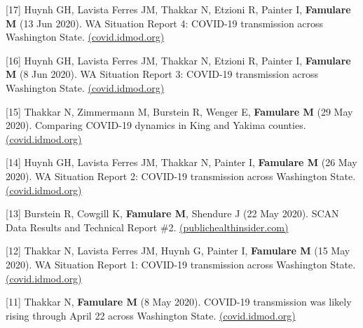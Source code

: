 \documentclass{article}
\begin{document}
\begin{llist}
\begin{items}
	\item[{[17]}] Huynh GH, Lavista Ferres JM, Thakkar N, Etzioni R, Painter I, \textbf{Famulare M} (13 Jun 2020). WA Situation Report 4: COVID-19 transmission across Washington State. \href{https://iazpvnewgrp01.blob.core.windows.net/source/2021-02/reports/pdf/WA_Situation_Report_4_COVID-19_transmission_across_Washington_State.pdf}{(covid.idmod.org)} 
	
	\item[{[16]}] Huynh GH, Lavista Ferres JM, Thakkar N, Etzioni R, Painter I, \textbf{Famulare M} (8 Jun 2020). WA Situation Report 3: COVID-19 transmission across Washington State. \href{https://iazpvnewgrp01.blob.core.windows.net/source/2021-02/reports/pdf/WA_Situation_Report_3_COVID-19_transmission_across_Washington_State.pdf}{(covid.idmod.org)} 
	
	\item[{[15]}] Thakkar N, Zimmermann M, Burstein R, Wenger E, \textbf{Famulare M} (29 May 2020). Comparing COVID-19 dynamics in King and Yakima counties. \href{https://iazpvnewgrp01.blob.core.windows.net/source/2021-02/reports/pdf/Comparing_COVID-19_dynamics_in_King_and_Yakima_counties.pdf}{(covid.idmod.org)}
	
	\item[{[14]}] Huynh GH, Lavista Ferres JM, Thakkar N, Painter I, \textbf{Famulare M} (26 May 2020). WA Situation Report 2: COVID-19 transmission across Washington State. \href{https://iazpvnewgrp01.blob.core.windows.net/source/2021-02/reports/pdf/WA_Situation_Report_2_COVID-19_transmission_across_Washington_State.pdf}{(covid.idmod.org)} 
	
	\item[{[13]}] Burstein R, Cowgill K, \textbf{Famulare M}, Shendure J (22 May 2020). SCAN Data Results and Technical Report \#2. \href{https://publichealthinsider.com/wp-content/uploads/2020/06/new-technical-report.pdf}{(publichealthinsider.com)}
	
	\item[{[12]}] Thakkar N, Lavista Ferres JM, Huynh G, Painter I, \textbf{Famulare M} (15 May 2020). WA Situation Report 1: COVID-19 transmission across Washington State. \href{https://iazpvnewgrp01.blob.core.windows.net/source/2021-02/reports/pdf/COVID-19_transmission_patterns_across_Washington_State.pdf}{(covid.idmod.org)}
	
	\item[{[11]}] Thakkar N, \textbf{Famulare M} (8 May 2020). COVID-19 transmission was likely rising through April 22 across Washington State. \href{https://iazpvnewgrp01.blob.core.windows.net/source/2021-02/reports/pdf/COVID-19-transmission-likely-rising-through-April22-across-Washington-State.pdf}{(covid.idmod.org)}
	

\end{items}
\end{llist}
\end{document}

